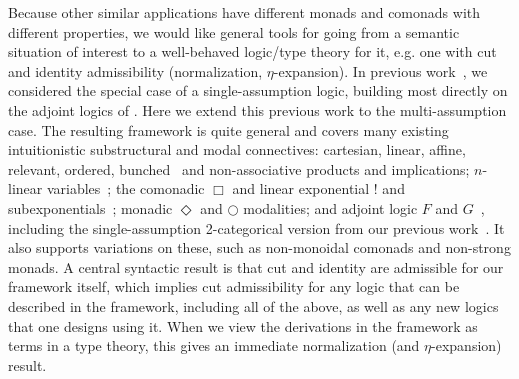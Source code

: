 Because other similar applications have different monads and comonads
with different properties, we would like general tools for going from a
semantic situation of interest to a well-behaved logic/type theory for
it, e.g. one with cut and identity admissibility (normalization,
$\eta$-expansion).  In previous work~\citep{ls16adjoint}, we considered
the special case of a single-assumption logic, building most directly on
the adjoint logics of
\citet{benton94mixed,bentonwadler96adjoint,reed09adjoint}.  Here we
extend this previous work to the multi-assumption case.  The resulting
framework is quite general and covers many existing intuitionistic
substructural and modal connectives: cartesian, linear, affine,
relevant, ordered, bunched~\citep{ohearnpym99bunched} and
non-associative products and implications; $n$-linear
variables~\citep{reed08namessubstructural,abel15modal,mcbride16nuttin};
the comonadic $\Box$ and linear exponential $!$ and
subexponentials~\citep{nigammiller09subexponentials,danos+93subexponentials};
monadic $\Diamond$ and $\bigcirc$ modalities; and adjoint logic $F$ and
$G$~\citep{benton94mixed,bentonwadler96adjoint,reed09adjoint}, including
the single-assumption 2-categorical version from our previous
work~\citep{ls16adjoint}.  It also supports variations on these, such as
non-monoidal comonads and non-strong monads.  A central syntactic result
is that cut and identity are admissible for our framework
itself, which implies cut admissibility for any logic that can be
described in the framework, including all of the above, as well as any
new logics that one designs using it.  When we view the derivations in
the framework as terms in a type theory, this gives an immediate
normalization (and $\eta$-expansion) result.

